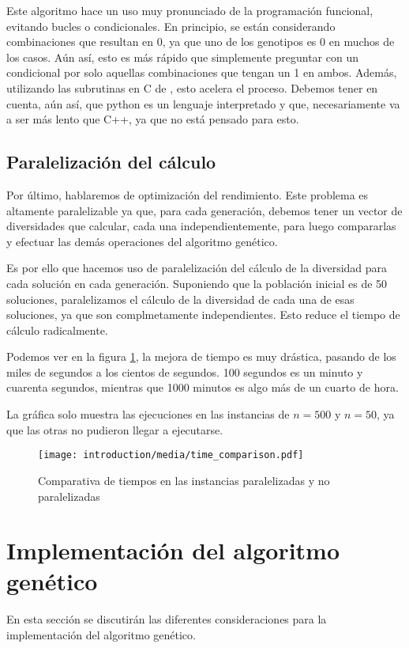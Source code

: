 Este algoritmo hace un uso muy pronunciado de la programación funcional, evitando bucles o condicionales. En principio, se están considerando combinaciones que resultan en 0, ya que uno de los genotipos es 0 en muchos de los casos. Aún así, esto es más rápido que simplemente preguntar con un condicional por solo aquellas combinaciones que tengan un 1 en ambos. Además, utilizando las subrutinas en C de , esto acelera el proceso. Debemos tener en cuenta, aún así, que python es un lenguaje interpretado y que, necesariamente va a ser más lento que C++, ya que no está pensado para esto.


\subsection{Paralelización del cálculo}
Por último, hablaremos de optimización del rendimiento. Este problema es altamente paralelizable ya que, para cada generación, debemos tener un vector de diversidades que calcular, cada una independientemente, para luego compararlas y efectuar las demás operaciones del algoritmo genético.

Es por ello que hacemos uso de paralelización del cálculo de la diversidad para cada solución en cada generación. Suponiendo que la población inicial es de 50 soluciones, paralelizamos el cálculo de la diversidad de cada una de esas soluciones, ya que son complmetamente independientes. Esto reduce el tiempo de cálculo radicalmente.

Podemos ver en la figura \ref{fig:time_comp}, la mejora de tiempo es muy drástica, pasando de los miles de segundos a los cientos de segundos. 100 segundos es un minuto y cuarenta segundos, mientras que 1000 minutos es algo más de un cuarto de hora.

La gráfica solo muestra las ejecuciones en las instancias de $n = 500$ y $n = 50$, ya que las otras no pudieron llegar a ejecutarse.

\begin{figure}[h]
    \centering
    \texttt{[image: introduction/media/time\_comparison.pdf]}
    \caption{Comparativa de tiempos en las instancias paralelizadas y no paralelizadas}
    \label{fig:time_comp}
\end{figure}




\section{Implementación del algoritmo genético}
En esta sección se discutirán las diferentes consideraciones para la implementación del algoritmo genético.

